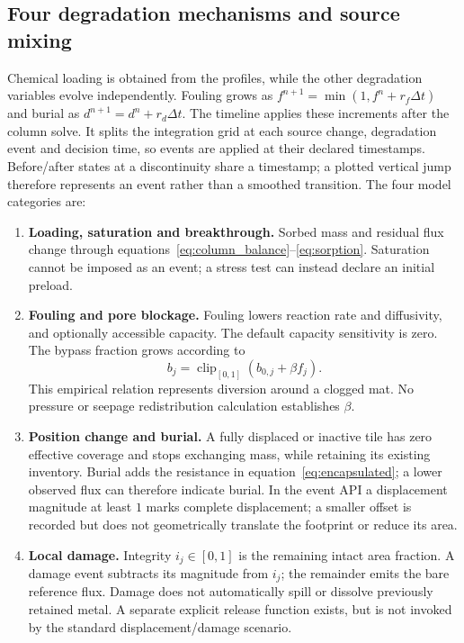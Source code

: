 \subsection{Four degradation mechanisms and source mixing}
\label{sec:degradation_methods}

Chemical loading is obtained from the profiles, while the other degradation variables evolve independently. Fouling grows as $f^{n+1}=\min(1,f^n+r_f\Delta t)$ and burial as $d^{n+1}=d^n+r_d\Delta t$. The timeline applies these increments after the column solve. It splits the integration grid at each source change, degradation event and decision time, so events are applied at their declared timestamps. Before/after states at a discontinuity share a timestamp; a plotted vertical jump therefore represents an event rather than a smoothed transition. The four model categories are:
\begin{enumerate}
 \item \textbf{Loading, saturation and breakthrough.} Sorbed mass and residual flux change through equations~\eqref{eq:column_balance}--\eqref{eq:sorption}. Saturation cannot be imposed as an event; a stress test can instead declare an initial preload.
 \item \textbf{Fouling and pore blockage.} Fouling lowers reaction rate and diffusivity, and optionally accessible capacity. The default capacity sensitivity is zero. The bypass fraction grows according to
 \begin{equation}b_j=\operatorname{clip}_{[0,1]}(b_{0,j}+\beta f_j).\label{eq:bypass}\end{equation}
 This empirical relation represents diversion around a clogged mat. No pressure or seepage redistribution calculation establishes $\beta$.
 \item \textbf{Position change and burial.} A fully displaced or inactive tile has zero effective coverage and stops exchanging mass, while retaining its existing inventory. Burial adds the resistance in equation~\eqref{eq:encapsulated}; a lower observed flux can therefore indicate burial. In the event API a displacement magnitude at least $1$ marks complete displacement; a smaller offset is recorded but does not geometrically translate the footprint or reduce its area.
 \item \textbf{Local damage.} Integrity $i_j\in[0,1]$ is the remaining intact area fraction. A damage event subtracts its magnitude from $i_j$; the remainder emits the bare reference flux. Damage does not automatically spill or dissolve previously retained metal. A separate explicit release function exists, but is not invoked by the standard displacement/damage scenario.
\end{enumerate}

